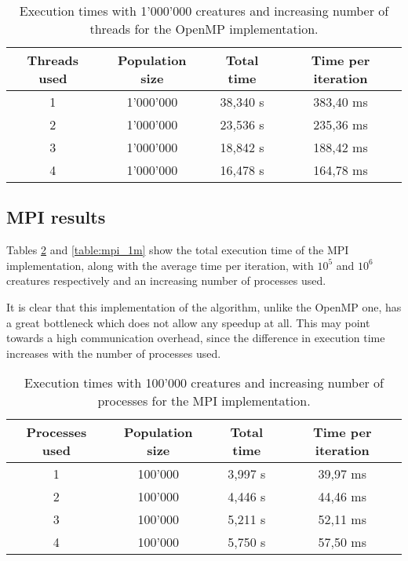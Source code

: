 \documentclass[12pt,a4paper,oneside]{article}
\begin{document}
	\begin{table}[!ht]
		\centering
		\begin{tabular}{|c|c|c|c|}
		\hline
		Threads used & Population size & Total time & Time per iteration \\ \hline
		1                 & 1'000'000           & 38,340 s           & 383,40 ms                   \\ \hline
		2                 & 1'000'000           & 23,536 s           & 235,36 ms                   \\ \hline
		3                 & 1'000'000           & 18,842 s           & 188,42 ms                   \\ \hline
		4                 & 1'000'000           & 16,478 s           & 164,78 ms                   \\ \hline
		\end{tabular}
		\caption{Execution times with 1'000'000 creatures and increasing number of threads for the OpenMP implementation.}
		\label{table:omp_1m}
	\end{table}

	\subsection{MPI results}
	Tables \ref{table:mpi_100k} and \ref{table:mpi_1m} show the total execution time of the MPI implementation, along with the average time per iteration, with $10^5$ and $10^6$ creatures respectively and an increasing number of processes used.

	It is clear that this implementation of the algorithm, unlike the OpenMP one, has a great bottleneck which does not allow any speedup at all.
	This may point towards a high communication overhead, since the difference in execution time increases with the number of processes used.

	\begin{table}[!ht]
		\centering
		\begin{tabular}{|c|c|c|c|}
		\hline
		Processes used & Population size & Total time & Time per iteration \\ \hline
		1                   & 100'000             & 3,997 s            & 39,97 ms                    \\ \hline
		2                   & 100'000             & 4,446 s            & 44,46 ms                    \\ \hline
		3                   & 100'000             & 5,211 s            & 52,11 ms                    \\ \hline
		4                   & 100'000             & 5,750 s            & 57,50 ms                    \\ \hline
		\end{tabular}
		\caption{Execution times with 100'000 creatures and increasing number of processes for the MPI implementation.}
		\label{table:mpi_100k}
	\end{table}
\end{document}
